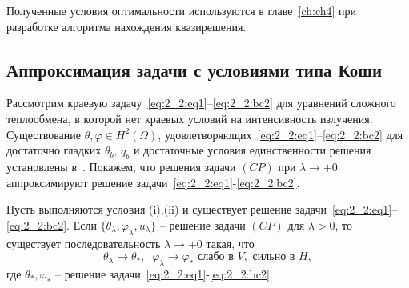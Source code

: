 Полученные условия оптимальности используются в главе~\ref{ch:ch4} при разработке алгоритма
нахождения квазирешения.

\subsection{Аппроксимация задачи с условиями типа Коши}
\label{subsec:ch2/sec2/approximation}

Рассмотрим краевую задачу~\eqref{eq:2_2:eq1}--\eqref{eq:2_2:bc2} для
уравнений сложного теплообмена, в которой нет краевых условий
на интенсивность излучения.
Существование $\theta,\varphi\in H^2(\Omega)$,
удовлетворяющих~\eqref{eq:2_2:eq1}--\eqref{eq:2_2:bc2} для достаточно гладких
$\theta_b,\, q_b$ и достаточные условия единственности решения
установлены в~\cite{CMMP20}.
Покажем, что решения задачи $(CP)$ при $\lambda\to+0$
аппроксимируют решение задачи~\eqref{eq:2_2:eq1}-\eqref{eq:2_2:bc2}.


\begin{theorem}
    \label{th:2_2:3}
    Пусть выполняются условия (i),(ii) и существует решение
    задачи~\eqref{eq:2_2:eq1}--\eqref{eq:2_2:bc2}.
    Если $\{\theta_\lambda,\varphi_\lambda,u_\lambda\}$ -- решение
    задачи $(CP)$ для $\lambda>0$, то существует последовательность $\lambda\to +0$
    такая, что
    \[
        \theta_\lambda\rightarrow\theta_*, \;\; \varphi_\lambda\rightarrow\varphi_*
        \text{ слабо в }V,\text{ сильно в }H,
    \]
    где $\theta_*,\varphi_*$ -- решение задачи~\eqref{eq:2_2:eq1}-\eqref{eq:2_2:bc2}.
\end{theorem}

